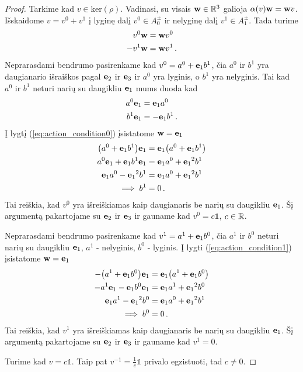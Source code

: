 \begin{proof}
	Tarkime kad $v \in \mathup{ker}(\rho)$.
	Vadinasi, su visais $\vb w \in \mathbb{R}^3$ galioja
	$\alpha(v)\vb w = \vb w v$.
	Išskaidome $v = v^0 + v^1$ į lyginę dalį $v^0 \in A^\pm_0$
	ir nelyginę dalį $v^1 \in A^\pm_1$.
	Tada turime
	\begin{align}
		\label{eq:action_condition0}
		v^0\vb w &= \vb w v^0
		\\
		\label{eq:action_condition1}
		- v^1\vb w &= \vb w v^1
		\,.
	\end{align}
	Neprarasdami bendrumo pasirenkame kad $v^0 = a^0 + \vb e_1 b^1$,
	čia $a^0$ ir $b^1$ yra daugianario išraiškos pagal $\vb e_2$ ir $\vb e_3$
	ir $a^0$ yra lyginis, o $b^1$ yra nelyginis.
	Tai kad $a^0$ ir $b^1$ neturi narių su daugikliu $\vb e_1$ mums duoda kad
	\begin{align}
		a^0\vb e_1 &= \vb e_1 a^0
		\\
		b^1\vb e_1 &= -\vb e_1 b^1
		\,.
	\end{align}
	Į lygtį (\ref{eq:action_condition0}) įsistatome $\vb w = \vb e_1$
	\begin{equation}
		\begin{aligned}
			\qty(a^0 + \vb e_1 b^1)\vb e_1 
			&= \vb e_1 \qty(a^0 + \vb e_1 b^1)
			\\
			a^0\vb e_1 + \vb e_1 b^1 \vb e_1
			&= \vb e_1 a^0 + {\vb e_1}^2 b^1
			\\
			\vb e_1 a^0 - {\vb e_1}^2 b^1 
			&= \vb e_1 a^0 + {\vb e_1}^2 b^1
			\\
			\implies b^1 &= 0
			\,.
		\end{aligned}
	\end{equation}
	Tai reiškia, kad $v^0$ yra išreiškiamas kaip daugianaris
	be narių su daugikliu $\vb e_1$.
	Šį argumentą pakartojame su $\vb e_2$ ir $\vb e_3$
	ir gauname kad $v^0 = c \mathbb1 $, $c \in \mathbb{R}$.

	Neprarasdami bendrumo pasirenkame kad $v^1 = a^1 + \vb e_1 b^0$,
	čia $a^1$ ir $b^0$ neturi narių su daugikliu $\vb e_1$,
	$a^1$ - nelyginis, $b^0$ - lyginis.
	Į lygti (\ref{eq:action_condition1}) įsistatome $\vb w = \vb e_1$
	\begin{equation}
		\begin{aligned}
			-\qty(a^1 + \vb e_1 b^0)\vb e_1 
			&= \vb e_1 \qty(a^1 + \vb e_1 b^0)
			\\
			-a^1\vb e_1 - \vb e_1 b^0 \vb e_1
			&= \vb e_1 a^1 + {\vb e_1}^2 b^0
			\\
			\vb e_1 a^1 - {\vb e_1}^2 b^0 
			&= \vb e_1 a^0 + {\vb e_1}^2 b^1
			\\
			\implies b^0 &= 0
			\,.
		\end{aligned}
	\end{equation}
	Tai reiškia, kad $v^1$ yra išreiškiamas kaip daugianaris
	be narių su daugikliu $\vb e_1$.
	Šį argumentą pakartojame su $\vb e_2$ ir $\vb e_3$
	ir gauname kad $v^1 = 0 $.

	Turime kad $v = c \mathbb1$.
	Taip pat $v^{-1} = \frac{1}{c} \mathbb1$ privalo egzistuoti,
	tad $c \neq 0$.
\end{proof}

